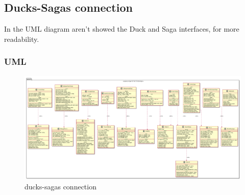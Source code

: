 
	\subsection{Ducks-Sagas connection}
	In the UML diagram aren't showed the Duck and Saga interfaces, for more readability.
	\subsubsection{UML}
	\begin{figure}[H]
		\centering
		\includegraphics[width=1\linewidth]{"../diagrammi/redux/ducks-sagas connection"}
		\caption{ducks-sagas connection}
		\label{fig:Ducks-sagas connection}
	\end{figure}
